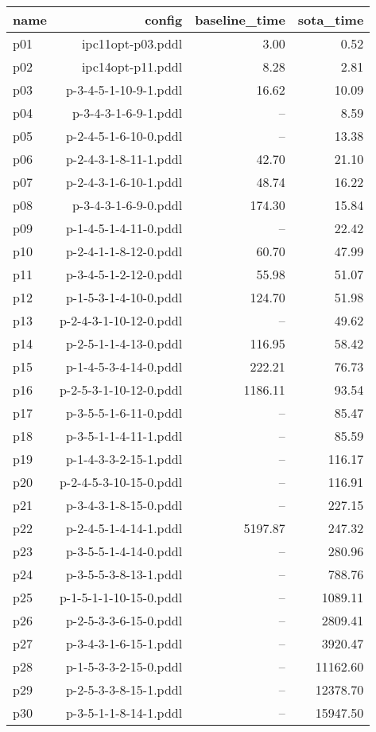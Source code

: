 \documentclass{article}
\begin{document}
                            \begin{center}
                            \scriptsize
                            \begin{tabular}{@{}l|r|r|r@{}}
                            name & config & baseline\_time & sota\_time\\\midrule
                              p01& ipc11opt-p03.pddl&3.00&0.52\\
  p02& ipc14opt-p11.pddl&8.28&2.81\\
  p03& p-3-4-5-1-10-9-1.pddl&16.62&10.09\\
  p04& p-3-4-3-1-6-9-1.pddl&--&8.59\\
  p05& p-2-4-5-1-6-10-0.pddl&--&13.38\\
  p06& p-2-4-3-1-8-11-1.pddl&42.70&21.10\\
  p07& p-2-4-3-1-6-10-1.pddl&48.74&16.22\\
  p08& p-3-4-3-1-6-9-0.pddl&174.30&15.84\\
  p09& p-1-4-5-1-4-11-0.pddl&--&22.42\\
  p10& p-2-4-1-1-8-12-0.pddl&60.70&47.99\\
  p11& p-3-4-5-1-2-12-0.pddl&55.98&51.07\\
  p12& p-1-5-3-1-4-10-0.pddl&124.70&51.98\\
  p13& p-2-4-3-1-10-12-0.pddl&--&49.62\\
  p14& p-2-5-1-1-4-13-0.pddl&116.95&58.42\\
  p15& p-1-4-5-3-4-14-0.pddl&222.21&76.73\\
  p16& p-2-5-3-1-10-12-0.pddl&1186.11&93.54\\
  p17& p-3-5-5-1-6-11-0.pddl&--&85.47\\
  p18& p-3-5-1-1-4-11-1.pddl&--&85.59\\
  p19& p-1-4-3-3-2-15-1.pddl&--&116.17\\
  p20& p-2-4-5-3-10-15-0.pddl&--&116.91\\
  p21& p-3-4-3-1-8-15-0.pddl&--&227.15\\
  p22& p-2-4-5-1-4-14-1.pddl&5197.87&247.32\\
  p23& p-3-5-5-1-4-14-0.pddl&--&280.96\\
  p24& p-3-5-5-3-8-13-1.pddl&--&788.76\\
  p25& p-1-5-1-1-10-15-0.pddl&--&1089.11\\
  p26& p-2-5-3-3-6-15-0.pddl&--&2809.41\\
  p27& p-3-4-3-1-6-15-1.pddl&--&3920.47\\
  p28& p-1-5-3-3-2-15-0.pddl&--&11162.60\\
  p29& p-2-5-3-3-8-15-1.pddl&--&12378.70\\
  p30& p-3-5-1-1-8-14-1.pddl&--&15947.50
                            \end{tabular}
                            \end{center}
                    
\end{document}
